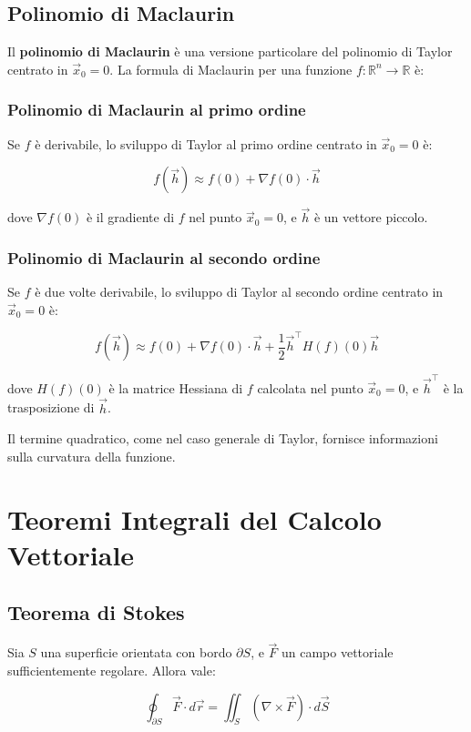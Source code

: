 \documentclass{article}
\begin{document}
\subsection*{Polinomio di Maclaurin}

Il \textbf{polinomio di Maclaurin} è una versione particolare del polinomio di Taylor centrato in \( \vec{x}_0 = 0 \). La formula di Maclaurin per una funzione \( f: \mathbb{R}^n \to \mathbb{R} \) è:

\subsubsection*{Polinomio di Maclaurin al primo ordine}
Se \( f \) è derivabile, lo sviluppo di Taylor al primo ordine centrato in \( \vec{x}_0 = 0 \) è:

\[
f(\vec{h}) \approx f(0) + \nabla f(0) \cdot \vec{h}
\]

dove \( \nabla f(0) \) è il gradiente di \( f \) nel punto \( \vec{x}_0 = 0 \), e \( \vec{h} \) è un vettore piccolo.

\subsubsection*{Polinomio di Maclaurin al secondo ordine}
Se \( f \) è due volte derivabile, lo sviluppo di Taylor al secondo ordine centrato in \( \vec{x}_0 = 0 \) è:

\[
f(\vec{h}) \approx f(0) + \nabla f(0) \cdot \vec{h} + \frac{1}{2} \vec{h}^\top H(f)(0) \vec{h}
\]

dove \( H(f)(0) \) è la matrice Hessiana di \( f \) calcolata nel punto \( \vec{x}_0 = 0 \), e \( \vec{h}^\top \) è la trasposizione di \( \vec{h} \).

Il termine quadratico, come nel caso generale di Taylor, fornisce informazioni sulla curvatura della funzione.




\section{Teoremi Integrali del Calcolo Vettoriale}
\subsection{Teorema di Stokes}
Sia \( S \) una superficie orientata con bordo \( \partial S \), e \( \vec{F} \) un campo vettoriale sufficientemente regolare. Allora vale:

\[
\oint_{\partial S} \vec{F} \cdot d\vec{r} = \iint_S (\nabla \times \vec{F}) \cdot d\vec{S}
\]
\end{document}
